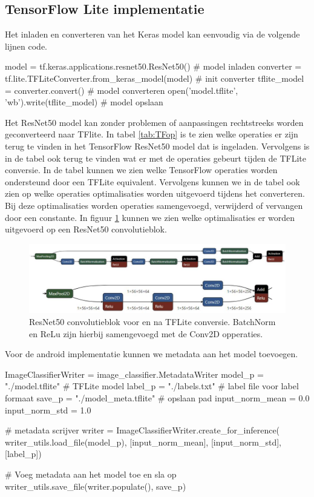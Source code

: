 \subsection{TensorFlow Lite implementatie} \label{tf_h_conv}
Het inladen en converteren van het Keras model kan eenvoudig via de volgende lijnen code.

\begin{python}
model = tf.keras.applications.resnet50.ResNet50() # model inladen
converter = tf.lite.TFLiteConverter.from_keras_model(model) # init converter
tflite_model = converter.convert() # model converteren
open('model.tflite', 'wb').write(tflite_model) # model opslaan
\end{python}

Het ResNet50 model kan zonder problemen of aanpassingen rechtstreeks worden geconverteerd naar TFlite.
In tabel \ref{tab:TFop} is te zien welke operaties er zijn terug te vinden in het TensorFlow ResNet50 model dat is ingeladen.
Vervolgens is in de tabel ook terug te vinden wat er met de operaties gebeurt tijden de TFLite conversie.
In de tabel kunnen we zien welke TensorFlow operaties worden ondersteund door een TFLite equivalent.
Vervolgens kunnen we in de tabel ook zien op welke operaties optimalisaties worden uitgevoerd tijdens het converteren.
Bij deze optimalisaties worden operaties samengevoegd, verwijderd of vervangen door een constante.
In figuur \ref{fig:class_opt} kunnen we zien welke optimalisaties er worden uitgevoerd op een ResNet50 convolutieblok.

\begin{figure}[!ht]
	\centering
	\includegraphics[width=1.0\linewidth]{fig/class_opt.jpg}
	\caption{ResNet50 convolutieblok voor en na TFLite conversie. BatchNorm en ReLu zijn hierbij samengevoegd met de Conv2D opperaties.}
	\label{fig:class_opt}
\end{figure}

Voor de android implementatie kunnen we metadata aan het model toevoegen.
\begin{python} 
ImageClassifierWriter = image_classifier.MetadataWriter
model_p = "./model.tflite" # TFLite model
label_p = "./labels.txt" # label file voor label formaat
save_p = "./model_meta.tflite" # opslaan pad
input_norm_mean = 0.0
input_norm_std = 1.0
    
# metadata scrijver
writer = ImageClassifierWriter.create_for_inference(
    writer_utils.load_file(model_p), [input_norm_mean], [input_norm_std],
    [label_p])
    
# Voeg metadata aan het model toe en sla op
writer_utils.save_file(writer.populate(), save_p)
\end{python}

